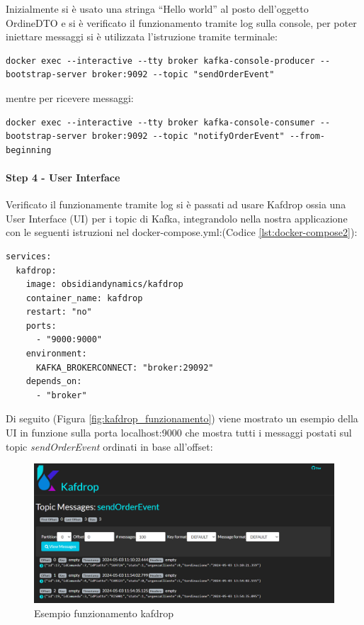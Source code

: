 Inizialmente si è usato una stringa “Hello world” al posto dell’oggetto OrdineDTO e si è verificato il funzionamento tramite log sulla console, per poter iniettare messaggi si è utilizzata l’istruzione tramite terminale:
\begin{lstlisting}[style=terminal, 
    caption={Operazione di post sul topic kafka}, label=lst:postkafka]
docker exec --interactive --tty broker kafka-console-producer --bootstrap-server broker:9092 --topic "sendOrderEvent"
\end{lstlisting}
mentre per ricevere messaggi:
\begin{lstlisting}[style=terminal, 
    caption={Operazione di get sul topic kafka}, label=lst:getkafka]
docker exec --interactive --tty broker kafka-console-consumer --bootstrap-server broker:9092 --topic "notifyOrderEvent" --from-beginning
\end{lstlisting}
\paragraph{Step 4 - User Interface} 
Verificato il funzionamente tramite log si è passati ad usare Kafdrop\cite{kafdrop} ossia una User Interface (UI) per i topic di Kafka, integrandolo nella nostra applicazione con le seguenti istruzioni nel docker-compose.yml:(Codice \vref{lst:docker-compose2}):
\begin{lstlisting}[language=docker-compose, caption={Aggiornamento del docker-compose.yaml perl per Kafdrop}, label=lst:docker-compose2]
services:  
  kafdrop:
    image: obsidiandynamics/kafdrop
    container_name: kafdrop
    restart: "no"
    ports:
      - "9000:9000"
    environment:
      KAFKA_BROKERCONNECT: "broker:29092"
    depends_on:
      - "broker"
\end{lstlisting}
Di seguito (Figura \vref{fig:kafdrop_funzionamento}) viene mostrato un esempio della UI in funzione sulla porta localhost:9000 che mostra tutti i messaggi postati sul topic \textit{sendOrderEvent} ordinati in base all'offset:
\begin{figure}[H]
    \centering
    \includegraphics[width=1\linewidth]{iterazione1//images/kafdrop_esempio_funzionamento.png}
    \caption{Esempio funzionamento kafdrop}
    \label{fig:kafdrop_funzionamento}
\end{figure}

